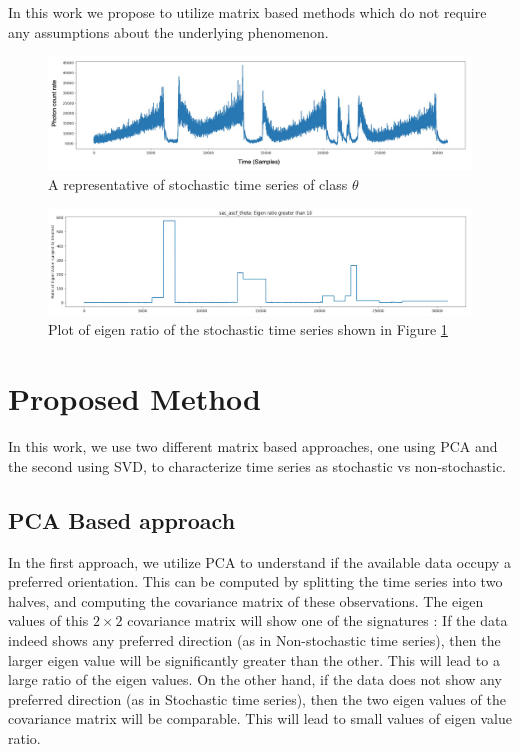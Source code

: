 \documentclass[10pt,conference]{IEEEtran}
\begin{document}
In this work we propose to utilize matrix based methods which do not require any assumptions about the underlying phenomenon.

\begin{figure}[ht]
  \centering
  \includegraphics[width=0.8\linewidth]{theta_ts_edited.drawio.png}
  \caption{A representative of stochastic time series of class $\theta$}
  \label{theta_ts}
\end{figure}
\begin{figure}[ht]
  \centering
  \includegraphics[width=0.8\linewidth]{theta_ts_eig.png}
  \caption{Plot of eigen ratio of the  stochastic time series shown in Figure \ref{theta_ts}}
  \label{theta_eig}
\end{figure}

\section{Proposed Method}
In this work, we use two different matrix based approaches, one using PCA and the second using SVD, to characterize time series as stochastic vs non-stochastic.

\subsection{PCA Based approach}
In the first approach, we utilize PCA to understand if the available data occupy a preferred orientation. This can be computed by splitting the time series into two halves, and computing the covariance matrix of these observations. The eigen values of this $2 \times 2$ covariance matrix will show one of the signatures : If the data indeed shows any preferred direction (as in Non-stochastic time series), then the larger eigen value will be significantly greater than the other. This will lead to a large ratio of the eigen values. On the other hand, if the data does not show any preferred direction (as in Stochastic time series), then the two eigen values of the covariance matrix will be comparable. This will lead to small values of eigen value ratio.
\end{document}
